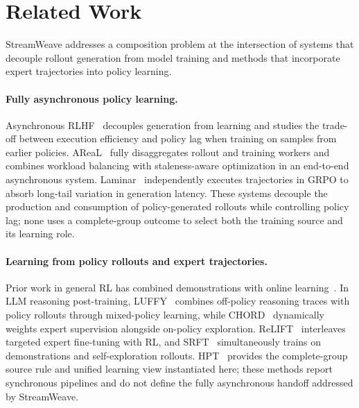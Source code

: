 \documentclass[letterpaper]{article}
\begin{document}
\section{Related Work}
\label{sec:related-work}

StreamWeave addresses a composition problem at the intersection of systems that decouple rollout generation from model training and methods that incorporate expert trajectories into policy learning.

\paragraph{Fully asynchronous policy learning.}
Asynchronous RLHF~\citep{noukhovitch2025asyncrlhf} decouples generation from learning and studies the trade-off between execution efficiency and policy lag when training on samples from earlier policies.
AReaL~\citep{fu2025areal} fully disaggregates rollout and training workers and combines workload balancing with staleness-aware optimization in an end-to-end asynchronous system.
Laminar~\citep{sheng2026laminar} independently executes trajectories in GRPO to absorb long-tail variation in generation latency.
These systems decouple the production and consumption of policy-generated rollouts while controlling policy lag; none uses a complete-group outcome to select both the training source and its learning role.

\paragraph{Learning from policy rollouts and expert trajectories.}
Prior work in general RL has combined demonstrations with online learning~\citep{hester2018dqfd,ball2023rlpd}.
In LLM reasoning post-training, LUFFY~\citep{yan2025luffy} combines off-policy reasoning traces with policy rollouts through mixed-policy learning, while CHORD~\citep{zhang2026chord} dynamically weights expert supervision alongside on-policy exploration.
ReLIFT~\citep{ma2026relift} interleaves targeted expert fine-tuning with RL, and SRFT~\citep{fu2026srft} simultaneously trains on demonstrations and self-exploration rollouts.
HPT~\citep{lv2025hpt} provides the complete-group source rule and unified learning view instantiated here; these methods report synchronous pipelines and do not define the fully asynchronous handoff addressed by StreamWeave.
\end{document}
